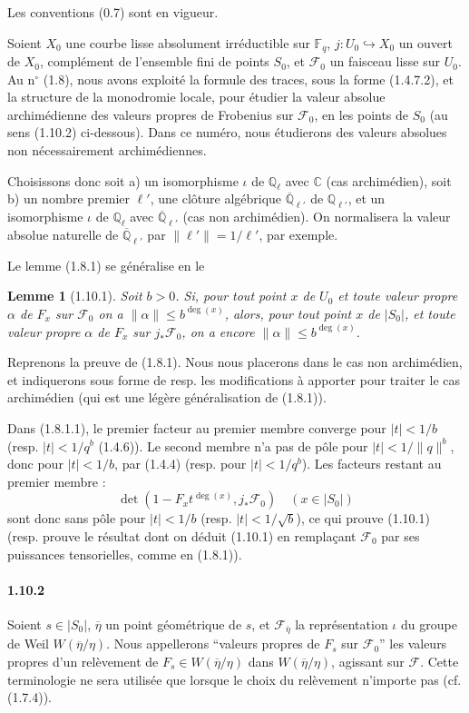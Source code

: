 \documentclass[12pt,a4paper]{article}
\theoremstyle{plain}
\newtheorem{lemma}[theorem]{Lemme}
\theoremstyle{definition}
\theoremstyle{remark}
\newcommand{\CC}{{\mathbb{C}}}
\newcommand{\FF}{{\mathbb{F}}}
\newcommand{\QQ}{{\mathbb{Q}}}
\newcommand{\QQbar}{{\overline{\QQ}}}
\begin{document}
Les conventions (0.7) sont en vigueur.

Soient $X_0$ une courbe lisse absolument irr\'eductible sur $\FF_q$, $j : U_0 \hookrightarrow X_0$ un ouvert de $X_0$, compl\'ement de l'ensemble fini de points $S_0$, et $\mathscr{F}_0$ un faisceau lisse sur $U_0$. Au n$^\circ$ (1.8), nous avons exploit\'e la formule des traces, sous la forme (1.4.7.2), et la structure de la monodromie locale, pour \'etudier la valeur absolue archim\'edienne des valeurs propres de Frobenius sur $\mathscr{F}_0$, en les points de $S_0$ (au sens (1.10.2) ci-dessous). Dans ce num\'ero, nous \'etudierons des valeurs absolues non n\'ecessairement archim\'ediennes.

Choisissons donc soit a) un isomorphisme $\iota$ de $\QQ_\ell$ avec $\CC$ (cas archim\'edien), soit b) un nombre premier $\ell'$, une cl\^oture alg\'ebrique $\QQbar_{\ell'}$ de $\QQ_{\ell'}$, et un isomorphisme $\iota$ de $\QQ_\ell$ avec $\QQbar_{\ell'}$ (cas non archim\'edien). On normalisera la valeur absolue naturelle de $\QQbar_{\ell'}$ par $\|\ell'\| = 1/\ell'$, par exemple.

Le lemme (1.8.1) se g\'en\'eralise en le

\begin{lemma}[1.10.1]
Soit $b > 0$. Si, pour tout point $x$ de $U_0$ et toute valeur propre $\alpha$ de $F_x$ sur $\mathscr{F}_0$ on a $\|\alpha\| \leq b^{\deg(x)}$, alors, pour tout point $x$ de $|S_0|$, et toute valeur propre $\alpha$ de $F_x$ sur $j_*\mathscr{F}_0$, on a encore $\|\alpha\| \leq b^{\deg(x)}$.
\end{lemma}

Reprenons la preuve de (1.8.1). Nous nous placerons dans le cas non archim\'edien, et indiquerons sous forme de resp. les modifications \`a apporter pour traiter le cas archim\'edien (qui est une l\'eg\`ere g\'en\'eralisation de (1.8.1)).

Dans (1.8.1.1), le premier facteur au premier membre converge pour $|t| < 1/b$ (resp. $|t| < 1/q^b$ (1.4.6)). Le second membre n'a pas de p\^ole pour $|t| < 1/\|q\|^b$, donc pour $|t| < 1/b$, par (1.4.4) (resp. pour $|t| < 1/q^b$). Les facteurs restant au premier membre :
\[ \det(1 - F_x t^{\deg(x)}, j_*\mathscr{F}_0) \quad (x \in |S_0|) \]
sont donc sans p\^ole pour $|t| < 1/b$ (resp. $|t| < 1/\sqrt{b}$), ce qui prouve (1.10.1) (resp. prouve le r\'esultat dont on d\'eduit (1.10.1) en rempla\c{c}ant $\mathscr{F}_0$ par ses puissances tensorielles, comme en (1.8.1)).

\paragraph{1.10.2}
Soient $s \in |S_0|$, $\overline{\eta}$ un point g\'eom\'etrique de $s$, et $\mathscr{F}_{\overline{\eta}}$ la repr\'esentation $\iota$ du groupe de Weil $W(\overline{\eta}/\eta)$. Nous appellerons ``valeurs propres de $F_s$ sur $\mathscr{F}_0$'' les valeurs propres d'un rel\`evement de $F_s \in W(\overline{\eta}/\eta)$ dans $W(\overline{\eta}/\eta)$, agissant sur $\mathscr{F}$. Cette terminologie ne sera utilis\'ee que lorsque le choix du rel\`evement n'importe pas (cf. (1.7.4)).
\end{document}
